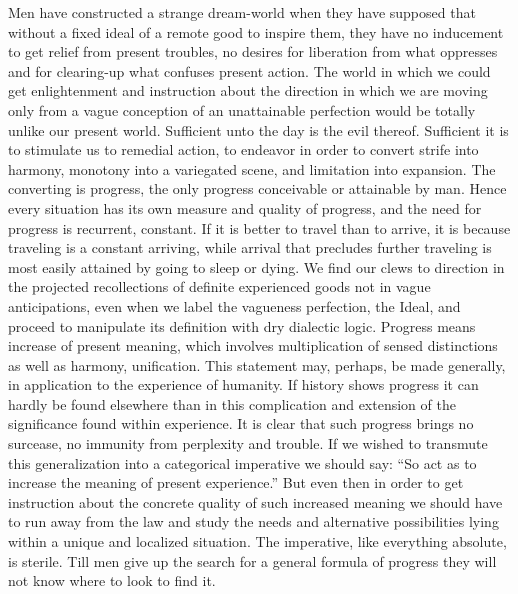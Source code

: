 \documentclass[12pt]{article}
\begin{document}
Men have constructed a strange dream-world when
they have supposed that without a fixed ideal of a remote
good to inspire them, they have no inducement to
get relief from present troubles, no desires for liberation
from what oppresses and for clearing-up what
confuses present action. The world in which we could
get enlightenment and instruction about the direction
in which we are moving only from a vague conception of
an unattainable perfection would be totally unlike our
present world. Sufficient unto the day is the evil
thereof. Sufficient it is to stimulate us to remedial
action, to endeavor in order to convert strife into harmony,
monotony into a variegated scene, and limitation
into expansion. The converting is progress, the only
progress conceivable or attainable by man. Hence
every situation has its own measure and quality of
progress, and the need for progress is recurrent, constant.
If it is better to travel than to arrive, it is because
traveling is a constant arriving, while arrival
that precludes further traveling is most easily attained
by going to sleep or dying. We find our clews to direction
in the projected recollections of definite experienced
goods not in vague anticipations, even when
we label the vagueness perfection, the Ideal, and proceed
to manipulate its definition with dry dialectic logic.
Progress means increase of present meaning, which involves
multiplication of sensed distinctions as well as
harmony, unification. This statement may, perhaps, be
made generally, in application to the experience of
humanity. If history shows progress it can hardly be
found elsewhere than in this complication and extension
of the significance found within experience. It is clear
that such progress brings no surcease, no immunity
from perplexity and trouble. If we wished to transmute
this generalization into a categorical imperative
we should say: ``So act as to increase the meaning of
present experience.'' But even then in order to get instruction
about the concrete quality of such increased
meaning we should have to run away from the law and
study the needs and alternative possibilities lying within
a unique and localized situation. The imperative,
like everything absolute, is sterile. Till men give up
the search for a general formula of progress they will
not know where to look to find it.
\end{document}
